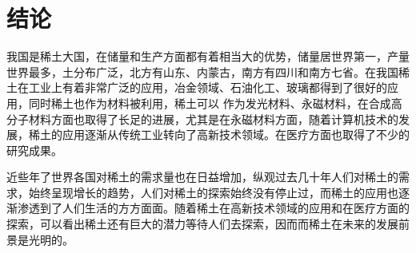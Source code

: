 \documentclass[twoside,twocolumn]{article}
\begin{document}
\section{结论}

我国是稀土大国，在储量和生产方面都有着相当大的优势，储量居世界第一，产量世界最多，土分布广泛，北方有山东、内蒙古，南方有四川和南方七省。在我国稀土在工业上有着非常广泛的应用，冶金领域、石油化工、玻璃都得到了很好的应用，同时稀土也作为材料被利用，稀土可以 作为发光材料、永磁材料，在合成高分子材料方面也取得了长足的进展，尤其是在永磁材料方面，随着计算机技术的发展，稀土的应用逐渐从传统工业转向了高新技术领域。在医疗方面也取得了不少的研究成果。

近些年了世界各国对稀土的需求量也在日益增加，纵观过去几十年人们对稀土的需求，始终呈现增长的趋势，人们对稀土的探索始终没有停止过，而稀土的应用也逐渐渗透到了人们生活的方方面面。随着稀土在高新技术领域的应用和在医疗方面的探索，可以看出稀土还有巨大的潜力等待人们去探索，因而而稀土在未来的发展前景是光明的。

\nocite{*}
\renewcommand\refname{\textbf{参考文献}}

\end{document}
